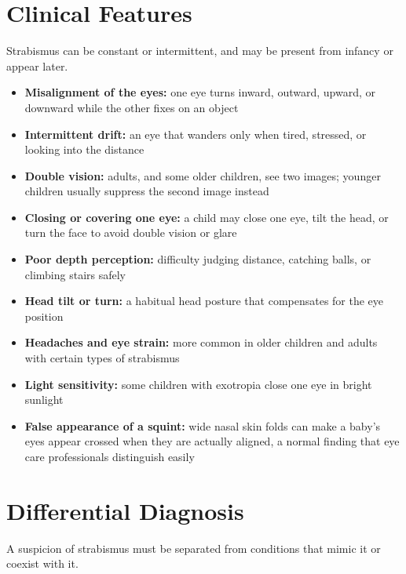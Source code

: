 \section*{Clinical Features}
Strabismus can be constant or intermittent, and may be present from infancy or appear later.

\begin{itemize}
    \item \textbf{Misalignment of the eyes:} one eye turns inward, outward, upward, or downward while the other fixes on an object
    \item \textbf{Intermittent drift:} an eye that wanders only when tired, stressed, or looking into the distance
    \item \textbf{Double vision:} adults, and some older children, see two images; younger children usually suppress the second image instead
    \item \textbf{Closing or covering one eye:} a child may close one eye, tilt the head, or turn the face to avoid double vision or glare
    \item \textbf{Poor depth perception:} difficulty judging distance, catching balls, or climbing stairs safely
    \item \textbf{Head tilt or turn:} a habitual head posture that compensates for the eye position
    \item \textbf{Headaches and eye strain:} more common in older children and adults with certain types of strabismus
    \item \textbf{Light sensitivity:} some children with exotropia close one eye in bright sunlight
    \item \textbf{False appearance of a squint:} wide nasal skin folds can make a baby's eyes appear crossed when they are actually aligned, a normal finding that eye care professionals distinguish easily
\end{itemize}

\section*{Differential Diagnosis}
A suspicion of strabismus must be separated from conditions that mimic it or coexist with it.

